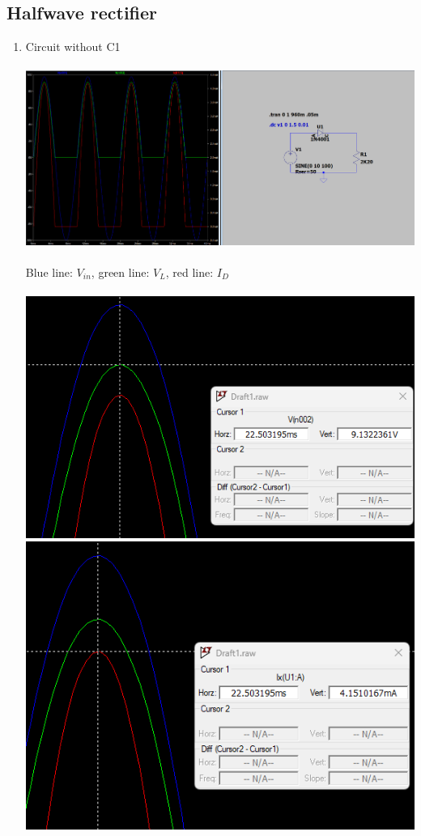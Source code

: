 \documentclass{article}
\begin{document}
		\subsection{Halfwave rectifier}
			\begin{enumerate}
				\item Circuit without C1\\\\
				\includegraphics[scale=0.35]{prelab/problem 2 - 1}\\\\
				Blue line: \(V_{in}\), green line: \(V_L\), red line: \(I_D\)\\\\
				\includegraphics[scale=0.5]{prelab/problem 2 - 2}
				\includegraphics[scale=0.5]{prelab/problem 2 - 3}\\\\

\end{enumerate}
\end{document}
